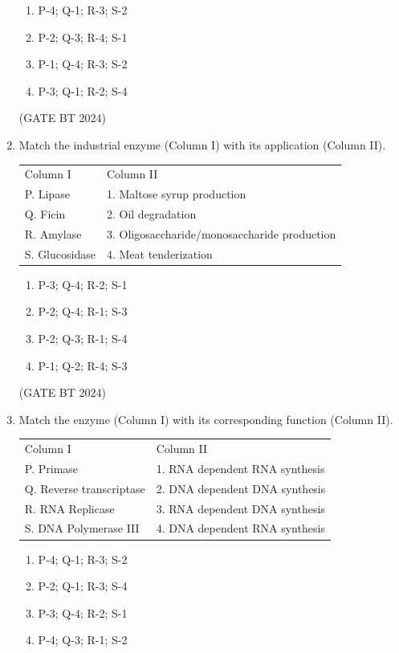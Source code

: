 \documentclass[journal,12pt,onecolumn]{IEEEtran}
\theoremstyle{remark}
\begin{document}
\begin{enumerate}
\begin{enumerate}
    \item P-4; Q-1; R-3; S-2
    \item P-2; Q-3; R-4; S-1
    \item P-1; Q-4; R-3; S-2
    \item P-3; Q-1; R-2; S-4
\end{enumerate}
\hfill(GATE BT 2024)

\item Match the industrial enzyme (Column I) with its application (Column II).

\begin{tabular}{ll}
Column I & Column II \\
P. Lipase & 1. Maltose syrup production \\
Q. Ficin & 2. Oil degradation \\
R. Amylase & 3. Oligosaccharide/monosaccharide production \\
S. Glucosidase & 4. Meat tenderization \\
\end{tabular}

\begin{enumerate}
    \item  P-3; Q-4; R-2; S-1 
    \item  P-2; Q-4; R-1; S-3 
    \item  P-2; Q-3; R-1; S-4 
    \item  P-1; Q-2; R-4; S-3
\end{enumerate}
\hfill (GATE BT 2024)

\item Match the enzyme (Column I) with its corresponding function (Column II).

\begin{tabular}{ll}
Column I & Column II \\
P. Primase & 1. RNA dependent RNA synthesis \\
Q. Reverse transcriptase & 2. DNA dependent DNA synthesis \\
R. RNA Replicase & 3. RNA dependent DNA synthesis \\
S. DNA Polymerase III & 4. DNA dependent RNA synthesis \\
\end{tabular}

\begin{enumerate}
\item P-4; Q-1; R-3; S-2 \hfill
\item P-2; Q-1; R-3; S-4 \hfill
\item P-3; Q-4; R-2; S-1 \hfill
\item P-4; Q-3; R-1; S-2
\end{enumerate}


\end{enumerate}
\end{document}
